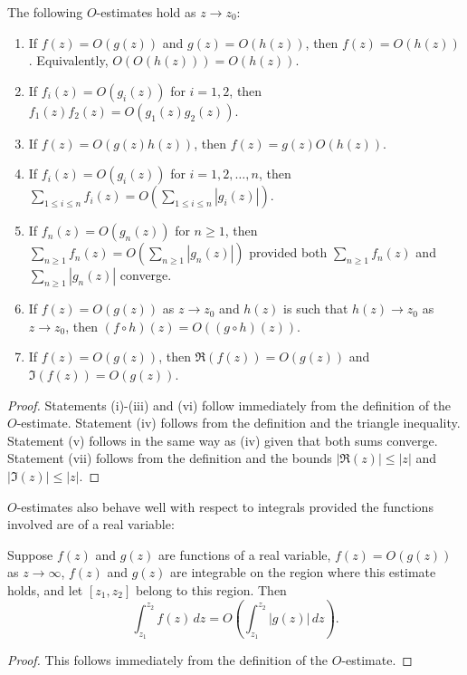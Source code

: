         \begin{proposition}\label{prop:Big_Oh_manipulations}
            The following $O$-estimates hold as $z \to z_{0}$:
            \begin{enumerate}[label=(\roman*)]
              \item If $f(z) = O(g(z))$ and $g(z) = O(h(z))$, then $f(z) = O(h(z))$. Equivalently, $O(O(h(z))) = O(h(z))$.
              \item If $f_{i}(z) = O(g_{i}(z))$ for $i = 1,2$, then $f_{1}(z)f_{2}(z) = O(g_{1}(z)g_{2}(z))$.
              \item If $f(z) = O(g(z)h(z))$, then $f(z) = g(z)O(h(z))$.
              \item If $f_{i}(z) = O(g_{i}(z))$ for $i = 1,2,\ldots,n$, then $\sum_{1 \le i \le n}f_{i}(z) = O\left(\sum_{1 \le i \le n}|g_{i}(z)|\right)$.
              \item If $f_{n}(z) = O(g_{n}(z))$ for $n \ge 1$, then $\sum_{n \ge 1}f_{n}(z) = O\left(\sum_{n \ge 1}|g_{n}(z)|\right)$ provided both $\sum_{n \ge 1}f_{n}(z)$ and $\sum_{n \ge 1}|g_{n}(z)|$ converge.
              \item If $f(z) = O(g(z))$ as $z \to z_{0}$ and $h(z)$ is such that $h(z) \to z_{0}$ as $z \to z_{0}$, then $(f \circ h)(z) = O((g \circ h)(z))$.
              \item If $f(z) = O(g(z))$, then $\Re(f(z)) = O(g(z))$ and $\Im(f(z)) = O(g(z))$.
            \end{enumerate}
        \end{proposition}
        \begin{proof}
          Statements (i)-(iii) and (vi) follow immediately from the definition of the $O$-estimate. Statement (iv) follows from the definition and the triangle inequality. Statement (v) follows in the same way as (iv) given that both sums converge. Statement (vii) follows from the definition and the bounds $|\Re(z)| \le |z|$ and $|\Im(z)| \le |z|$.
        \end{proof}

        $O$-estimates also behave well with respect to integrals provided the functions involved are of a real variable:

        \begin{proposition}
          Suppose $f(z)$ and $g(z)$ are functions of a real variable, $f(z) = O(g(z))$ as $z \to \infty$, $f(z)$ and $g(z)$ are integrable on the region where this estimate holds, and let $[z_{1},z_{2}]$ belong to this region. Then
          \[
            \int_{z_{1}}^{z_{2}}f(z)\,dz = O\left(\int_{z_{1}}^{z_{2}}|g(z)|\,dz\right).
          \]
        \end{proposition}
        \begin{proof}
          This follows immediately from the definition of the $O$-estimate.
        \end{proof}

